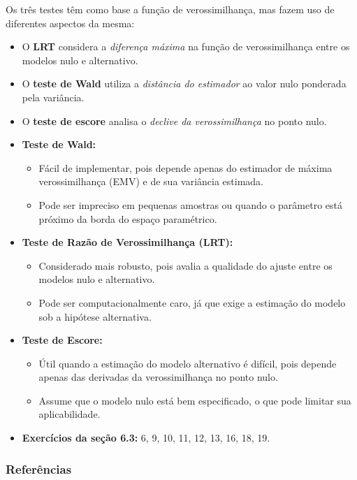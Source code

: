 \documentclass[12pt]{beamer}
\begin{document}
\begin{frame}
	\begin{block}{}
		\justifying
		Os três testes têm como base a função de verossimilhança, mas fazem uso de diferentes aspectos da mesma:
		\begin{itemize}
			\justifying
			\item O \textbf{LRT} considera a \textit{diferença máxima} na função de verossimilhança entre os modelos nulo e alternativo.\pause
			\item O \textbf{teste de Wald} utiliza a \textit{distância do estimador} ao valor nulo ponderada pela variância.\pause
			\item O \textbf{teste de escore} analisa o \textit{declive da verossimilhança} no ponto nulo.
		\end{itemize}
	\end{block}
\end{frame}

\begin{frame}
	\begin{block}{}
		\begin{itemize}
			\justifying
			\item \textbf{Teste de Wald:} 
			\begin{itemize}
				\justifying
				\item Fácil de implementar, pois depende apenas do estimador de máxima verossimilhança (EMV) e de sua variância estimada.\pause
				\item Pode ser impreciso em pequenas amostras ou quando o parâmetro está próximo da borda do espaço paramétrico.\pause
			\end{itemize}
			\item \textbf{Teste de Razão de Verossimilhança (LRT):}
			\begin{itemize}
				\justifying
				\item Considerado mais robusto, pois avalia a qualidade do ajuste entre os modelos nulo e alternativo.\pause
				\item Pode ser computacionalmente caro, já que exige a estimação do modelo sob a hipótese alternativa.\pause
			\end{itemize}
			\item \textbf{Teste de Escore:}
			\begin{itemize}
				\justifying
				\item Útil quando a estimação do modelo alternativo é difícil, pois depende apenas das derivadas da verossimilhança no ponto nulo.\pause
				\item Assume que o modelo nulo está bem especificado, o que pode limitar sua aplicabilidade.
			\end{itemize}
		\end{itemize}
	\end{block}
\end{frame}

\begin{frame}{\Home}
\begin{block}{}
\justifying
\begin{itemize}
    \item \textbf{Exercícios da seção 6.3:} 6, 9, 10, 11, 12, 13, 16, 18, 19.
\end{itemize}
\end{block}
\nocite{hogg}
\end{frame}

\begin{frame}[allowframebreaks]
\frametitle{\bf Referências}
\printbibliography
\end{frame}
\end{document}
